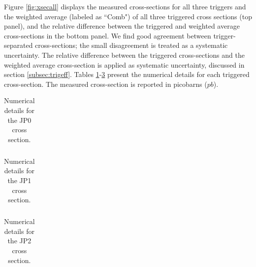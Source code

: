 
Figure \ref{fig:xsecall} displays the measured cross-sections for all three triggers and the weighted average (labeled as ``Comb") of all three triggered cross sections (top panel), and the relative difference between the triggered and weighted average cross-sections in the bottom panel. We find good agreement between trigger-separated cross-sections; the small disagreement is treated as a systematic uncertainty. The relative difference between the triggered cross-sections and the weighted average cross-section is applied as systematic uncertainty, discussed in section \ref{subsec:trigeff}. Tables \ref{tab:xsecjp0}-\ref{tab:xsecjp2} present the numerical details for each triggered cross-section. The measured cross-section is reported in picobarns ($pb$).

\begin{table}    
    \centering
    \begin{tabular}{|c|c|c|c|c|c|c|c|c|c|c|}
    \hline
    
    \end{tabular}
    \caption{Numerical details for the JP0 cross section.}
    \label{tab:xsecjp0}
\end{table}

\begin{table}    
    \centering
    \begin{tabular}{|c|c|c|c|c|c|c|c|c|c|c|}
    \hline
    
    \end{tabular}
    \caption{Numerical details for the JP1 cross section.}
    \label{tab:xsecjp1}
\end{table}

\begin{table}    
    \centering
    \begin{tabular}{|c|c|c|c|c|c|c|c|c|c|c|}
    \hline
    
    \end{tabular}
    \caption{Numerical details for the JP2 cross section.}
    \label{tab:xsecjp2}
\end{table}



